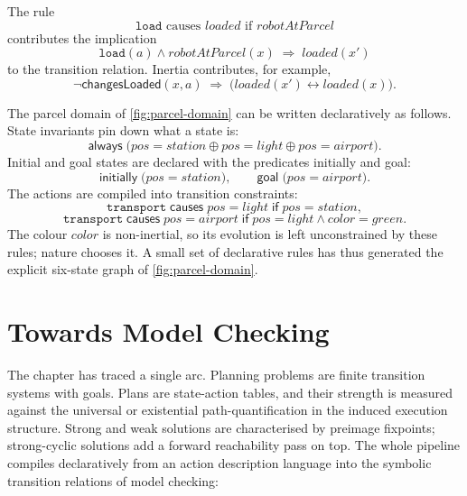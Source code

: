 \begin{example}
\label{ex:compile-action-rule}
The rule
\[
  \texttt{load}\text{ causes }\mathit{loaded}
  \text{ if }\mathit{robotAtParcel}
\]
contributes the implication
\[
  \texttt{load}(a)\wedge \mathit{robotAtParcel}(x)
  \;\Longrightarrow\;
  \mathit{loaded}(x')
\]
to the transition relation.  Inertia contributes, for example,
\[
  \neg\textsf{changesLoaded}(x,a)
  \;\Longrightarrow\;
  \big(\mathit{loaded}(x')\leftrightarrow \mathit{loaded}(x)\big).
\]
\end{example}

\begin{example}
\label{ex:parcel-rules}
The parcel domain of \cref{fig:parcel-domain} can be written
declaratively as follows.  State invariants pin down what a state is:
\[
  \textsf{always}\;\Big(\mathit{pos}=\mathit{station}\oplus
  \mathit{pos}=\mathit{light}\oplus\mathit{pos}=\mathit{airport}\Big).
\]
Initial and goal states are declared with the predicates
\textsf{initially} and \textsf{goal}:
\[
  \textsf{initially}\;\big(\mathit{pos}=\mathit{station}\big),
  \qquad
  \textsf{goal}\;\big(\mathit{pos}=\mathit{airport}\big).
\]
The actions are compiled into transition constraints:
\[
  \texttt{transport}\;\textsf{causes}\;
  \mathit{pos}=\mathit{light}\;\textsf{if}\;
  \mathit{pos}=\mathit{station},
\]
\[
  \texttt{transport}\;\textsf{causes}\;
  \mathit{pos}=\mathit{airport}\;\textsf{if}\;
  \mathit{pos}=\mathit{light}\wedge \mathit{color}=\mathit{green}.
\]
The colour $\mathit{color}$ is non-inertial, so its evolution is left
unconstrained by these rules; nature chooses it.  A small set of
declarative rules has thus generated the explicit six-state graph of
\cref{fig:parcel-domain}.
\end{example}

\section{Towards Model Checking}
\label{sec:planning-towards-mc}

The chapter has traced a single arc.  Planning problems are finite
transition systems with goals.  Plans are state-action tables, and
their strength is measured against the universal or existential
path-quantification in the induced execution structure.  Strong and
weak solutions are characterised by preimage fixpoints; strong-cyclic
solutions add a forward reachability pass on top.  The whole pipeline
compiles declaratively from an action description language into the
symbolic transition relations of model checking:

